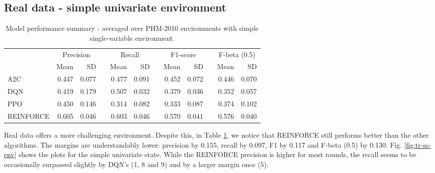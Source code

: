 \documentclass[a4paper, 12pt]{article}
\newcommand{\rowspace}[1]{\renewcommand{\arraystretch}{#1}}
\begin{document}
\subsection{Real data - simple univariate environment}
\begin{table}[!htb]\centering
	\sffamily
	\rowspace{1.3}
	\begin{tabular}{@{}l rr c rr c rr c rr@{}}
		\arrayrulecolor{black!40}\toprule
		& \multicolumn{2}{c}{Precision} & \phantom{i} & \multicolumn{2}{c}{Recall} & \phantom{i} & \multicolumn{2}{c}{F1-score} & \phantom{i} & \multicolumn{2}{c}{F-beta (0.5)} \\
		\cmidrule{2-3} \cmidrule{5-6} \cmidrule{8-9} \cmidrule{11-12} 
		
		&Mean &SD & &Mean &SD & &Mean &SD& &Mean & SD\\ \midrule
		A2C & 0.447 & 0.077 & &0.477 & 0.091 & & 0.452 & 0.072 & &0.446 &0.070 \\
		DQN & 0.419 & 0.179 & &0.507 & 0.032 & & 0.379 & 0.036 & &0.352 &0.057 \\
		PPO & 0.450 & 0.146 & &0.314 & 0.082 & & 0.333 & 0.087 & &0.374 &0.102 \\
		REINFORCE & 0.605 & 0.046 & &0.603 & 0.046 & & 0.570 & 0.041 & &0.576 &0.040 \\
		
		\bottomrule
	\end{tabular}
	\caption{Model performance summary - averaged over PHM-2010 environments with simple single-variable environment.}
	\label{tbl:PHMSS}
\end{table}
Real data offers a more challenging environment. Despite this, in Table \ref{tbl:PHMSS}, we notice that REINFORCE  still performs better than the other algorithms. The margins are understandably lower: precision by 0.155, recall by 0.097, F1 by 0.117 and F-beta (0.5) by 0.130. Fig. \ref{fig:tr-ss-env} shows the plots for the simple univariate state. While the REINFORCE precision is higher for most rounds, the recall seems to be occasionally surpassed slightly by DQN's (1, 8 and 9) and by a larger margin once (5).
\end{document}
